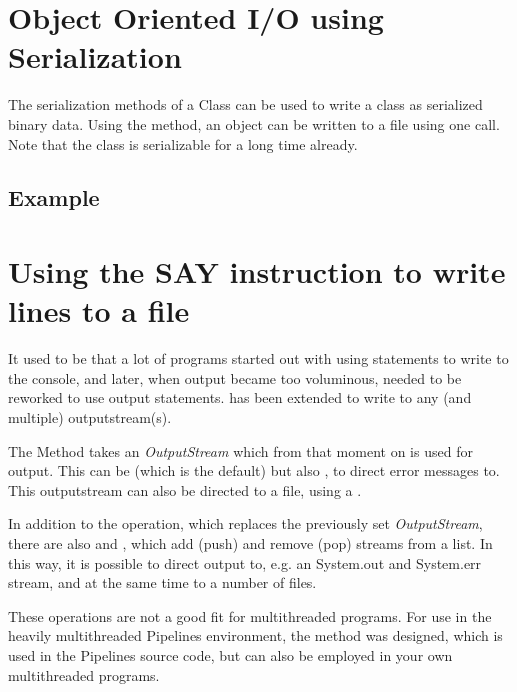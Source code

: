 {\section{Object Oriented I/O using Serialization}
The serialization methods of a Class can be used to write a class as
serialized binary data. Using the  method, an
object can be written to a file using one call. Note that the \Rexx{}
class is serializable for a long time already.
\subsection{Example}




\section{Using the SAY instruction to write lines to a file}
It used to be that a lot of programs started out with using
 statements to write to the console, and later, when
output became too voluminous, needed to be reworked to use output
statements.  has been extended to write to any (and
multiple) outputstream(s).

The  Method takes an \emph{OutputStream} which
from that moment on is used for output. This can be
 (which is the default) but also
, to direct error messages to. This outputstream
can also be directed to a file, using a .

In addition to the  operation, which
replaces the previously set \emph{OutputStream}, there are
also  and ,
which add (push) and remove (pop) streams from a list. In this way, it
is possible to direct output to, e.g. an System.out and System.err
stream, and at the same time to a number of files.

These operations are not a good fit for multithreaded programs. For
use in the heavily multithreaded Pipelines environment, the method
 was designed, which is used in the Pipelines
source code, but can also be employed in your own multithreaded programs.
}
